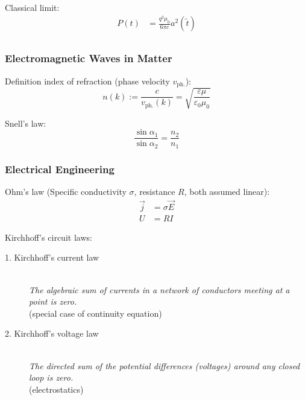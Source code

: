 			\noindent 
			Classical limit:
			\begin{equation}
				\begin{aligned}
					P(t) &= \frac{q^2 \mu_0}{6\pi c}a^2(\tilde{t}) \\
				\end{aligned}
			\end{equation}
			

		\subsubsection{Electromagnetic Waves in Matter}
			\noindent
			Definition index of refraction (phase velocity $v_\text{ph.}$):
			\begin{equation}
				n(k) := \frac{c}{v_\text{ph.}(k)} = \sqrt{\frac{\varepsilon\mu}{\varepsilon_0\mu_0}}
			\end{equation}

			\noindent
			Snell's law:
			\begin{equation}
				\frac{\sin\alpha_1}{\sin\alpha_2} = \frac{n_2}{n_1}
			\end{equation}



		\subsubsection{Electrical Engineering}
			\noindent
			Ohm's law (Specific conductivity $\sigma$, resistance $R$, both assumed linear):
			\begin{equation}
				\begin{aligned}
					\vec{j} &= \sigma\vec{E} \\
					U &= R I
				\end{aligned}
			\end{equation}

			\noindent
			Kirchhoff's circuit laws:
			\begin{description}
				\item[1. Kirchhoff's current law] \hfill \\
					{\textit{The algebraic sum of currents in a network of conductors meeting at a point is zero.} \\(special case of continuity equation)}
				\item[2. Kirchhoff's voltage law] \hfill \\
					{\textit{The directed sum of the potential differences (voltages) around any closed loop is zero.} \\(electrostatics)}
			\end{description}

